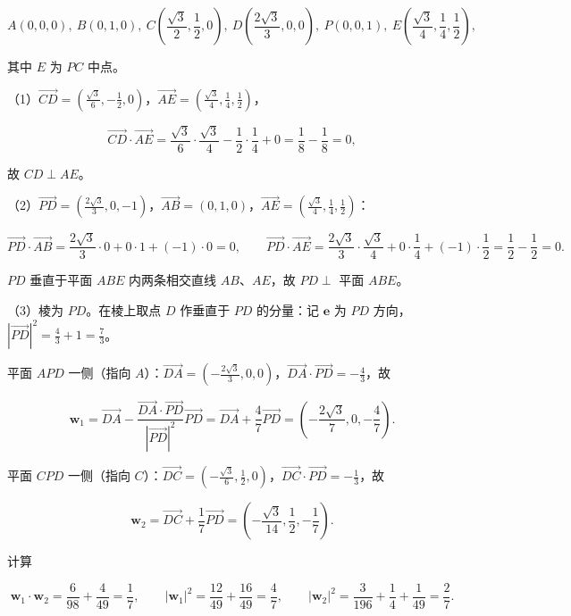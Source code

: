 \begin{answer}
\nopagebreak[4]
\[A(0,0,0),\ B(0,1,0),\ C\left(\frac{\sqrt3}2,\frac12,0\right),\ D\left(\frac{2\sqrt3}3,0,0\right),\ P(0,0,1),\ E\left(\frac{\sqrt3}4,\frac14,\frac12\right),\]

其中 $E$ 为 $PC$ 中点。

（1）$\overrightarrow{CD}=\left(\frac{\sqrt3}6,-\frac12,0\right)$，$\overrightarrow{AE}=\left(\frac{\sqrt3}4,\frac14,\frac12\right)$，

\nopagebreak[4]
\[\overrightarrow{CD}\cdot\overrightarrow{AE}=\frac{\sqrt3}6\cdot\frac{\sqrt3}4-\frac12\cdot\frac14+0=\frac18-\frac18=0,\]

故 $CD\perp AE$。

（2）$\overrightarrow{PD}=\left(\frac{2\sqrt3}3,0,-1\right)$，$\overrightarrow{AB}=(0,1,0)$，$\overrightarrow{AE}=\left(\frac{\sqrt3}4,\frac14,\frac12\right)$：

\nopagebreak[4]
\[\overrightarrow{PD}\cdot\overrightarrow{AB}=\frac{2\sqrt3}3\cdot0+0\cdot1+\left(-1\right)\cdot0=0,\qquad \overrightarrow{PD}\cdot\overrightarrow{AE}=\frac{2\sqrt3}3\cdot\frac{\sqrt3}4+0\cdot\frac14+\left(-1\right)\cdot\frac12=\frac12-\frac12=0 .\]

$PD$ 垂直于平面 $ABE$ 内两条相交直线 $AB$、$AE$，故 $PD\perp$ 平面 $ABE$。

（3）棱为 $PD$。在棱上取点 $D$ 作垂直于 $PD$ 的分量：记 $\boldsymbol e$ 为 $PD$ 方向，$|\overrightarrow{PD}|^2=\frac43+1=\frac73$。

平面 $APD$ 一侧（指向 $A$）：$\overrightarrow{DA}=\left(-\frac{2\sqrt3}3,0,0\right)$，$\overrightarrow{DA}\cdot\overrightarrow{PD}=-\frac43$，故

\nopagebreak[4]
\[\boldsymbol w_1=\overrightarrow{DA}-\frac{\overrightarrow{DA}\cdot\overrightarrow{PD}}{|\overrightarrow{PD}|^2}\overrightarrow{PD}=\overrightarrow{DA}+\frac47\overrightarrow{PD}=\left(-\frac{2\sqrt3}7,0,-\frac47\right).\]

平面 $CPD$ 一侧（指向 $C$）：$\overrightarrow{DC}=\left(-\frac{\sqrt3}6,\frac12,0\right)$，$\overrightarrow{DC}\cdot\overrightarrow{PD}=-\frac13$，故

\nopagebreak[4]
\[\boldsymbol w_2=\overrightarrow{DC}+\frac17\overrightarrow{PD}=\left(-\frac{\sqrt3}{14},\frac12,-\frac17\right).\]

计算

\nopagebreak[4]
\[\boldsymbol w_1\cdot\boldsymbol w_2=\frac{6}{98}+\frac4{49}=\frac17,\qquad |\boldsymbol w_1|^2=\frac{12}{49}+\frac{16}{49}=\frac47,\qquad |\boldsymbol w_2|^2=\frac3{196}+\frac14+\frac1{49}=\frac27 .\]


\end{answer}
